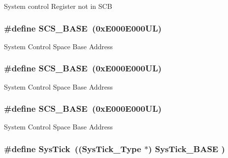 System control Register not in S\-C\-B \hypertarget{group___c_m_s_i_s__core__register_ga3c14ed93192c8d9143322bbf77ebf770}{
\subsubsection[{S\-C\-S\-\_\-\-B\-A\-S\-E}]{\setlength{\rightskip}{0pt plus 5cm}\#define S\-C\-S\-\_\-\-B\-A\-S\-E~(0x\-E000\-E000\-U\-L)}}\label{group___c_m_s_i_s__core__register_ga3c14ed93192c8d9143322bbf77ebf770}
System Control Space Base Address \hypertarget{group___c_m_s_i_s__core__register_ga3c14ed93192c8d9143322bbf77ebf770}{
\subsubsection[{S\-C\-S\-\_\-\-B\-A\-S\-E}]{\setlength{\rightskip}{0pt plus 5cm}\#define S\-C\-S\-\_\-\-B\-A\-S\-E~(0x\-E000\-E000\-U\-L)}}\label{group___c_m_s_i_s__core__register_ga3c14ed93192c8d9143322bbf77ebf770}
System Control Space Base Address \hypertarget{group___c_m_s_i_s__core__register_ga3c14ed93192c8d9143322bbf77ebf770}{
\subsubsection[{S\-C\-S\-\_\-\-B\-A\-S\-E}]{\setlength{\rightskip}{0pt plus 5cm}\#define S\-C\-S\-\_\-\-B\-A\-S\-E~(0x\-E000\-E000\-U\-L)}}\label{group___c_m_s_i_s__core__register_ga3c14ed93192c8d9143322bbf77ebf770}
System Control Space Base Address \hypertarget{group___c_m_s_i_s__core__register_gacd96c53beeaff8f603fcda425eb295de}{
\subsubsection[{Sys\-Tick}]{\setlength{\rightskip}{0pt plus 5cm}\#define Sys\-Tick~(({\bf Sys\-Tick\-\_\-\-Type}   $\ast$)     {\bf Sys\-Tick\-\_\-\-B\-A\-S\-E}  )}}\label{group___c_m_s_i_s__core__register_gacd96c53beeaff8f603fcda425eb295de}
